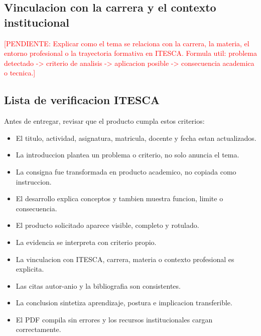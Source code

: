 \documentclass[
	spanish,
	letterpaper, oneside
]{article}
\newcommand{\pendiente}[1]{\textcolor{red}{[PENDIENTE: #1]}}
\begin{document}
\subsection{Vinculacion con la carrera y el contexto institucional}

\pendiente{Explicar como el tema se relaciona con la carrera, la materia, el entorno profesional o la trayectoria formativa en ITESCA. Formula util: problema detectado -> criterio de analisis -> aplicacion posible -> consecuencia academica o tecnica.}

\subsection{Lista de verificacion ITESCA}

Antes de entregar, revisar que el producto cumpla estos criterios:

\begin{itemize}
	\item El titulo, actividad, asignatura, matricula, docente y fecha estan actualizados.
	\item La introduccion plantea un problema o criterio, no solo anuncia el tema.
	\item La consigna fue transformada en producto academico, no copiada como instruccion.
	\item El desarrollo explica conceptos y tambien muestra funcion, limite o consecuencia.
	\item El producto solicitado aparece visible, completo y rotulado.
	\item La evidencia se interpreta con criterio propio.
	\item La vinculacion con ITESCA, carrera, materia o contexto profesional es explicita.
	\item Las citas autor-anio y la bibliografia son consistentes.
	\item La conclusion sintetiza aprendizaje, postura e implicacion transferible.
	\item El PDF compila sin errores y los recursos institucionales cargan correctamente.
\end{itemize}


\end{document}
